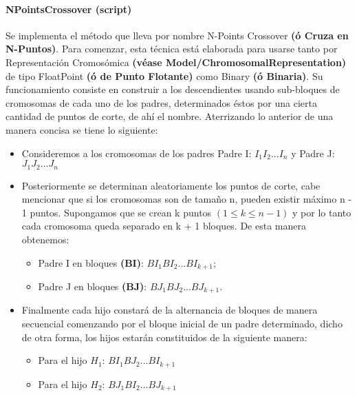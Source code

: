 \documentclass[class=report, crop=false]{standalone}
\begin{document}
\paragraph{NPointsCrossover (script)}
\label{sec:a_2_4_2_1}

\begin{fulllineitems}

\begin{DUlineblock}{0em}
\item[] Se implementa el método que lleva por nombre N-Points 
Crossover \textbf{(ó Cruza en N-Puntos)}.\break
Para comenzar, esta técnica está elaborada para usarse 
tanto por Representación Cromosómica \textbf{(véase Model/ChromosomalRepresentation)} 
de tipo FloatPoint \textbf{(ó de Punto Flotante)} como Binary \textbf{(ó Binaria)}.\medskip\break
Su funcionamiento consiste en construir a los descendientes 
usando sub-bloques de cromosomas de cada uno de los padres, 
determinados éstos por una cierta cantidad de puntos de corte, 
de ahí el nombre.\break
Aterrizando lo anterior de una manera concisa se tiene lo siguiente:

\begin{itemize}
\item Consideremos a los cromosomas de los padres Padre I: \(I_1I_2...I_n\) y Padre J: \(J_1J_2...J_n\)
\item Posteriormente se determinan aleatoriamente los puntos de corte, cabe mencionar que si los cromosomas son de tamaño n, pueden existir máximo n - 1 puntos. Supongamos que se crean k puntos \((1 \leqslant k \leqslant n - 1)\) y por lo tanto cada cromosoma queda separado en k + 1 bloques.\break
De esta manera obtenemos:
      \begin{itemize}
      \item Padre I en bloques \textbf{(BI)}: \(BI_1BI_2...BI_{k + 1}\);
      \item Padre J en bloques \textbf{(BJ)}: \(BJ_1BJ_2...BJ_{k + 1}\).
      \end{itemize}
\item Finalmente cada hijo constará de la alternancia de bloques de manera secuencial comenzando por el bloque inicial de un padre determinado, dicho de otra forma, los hijos estarán constituidos de la siguiente manera:
      \begin{itemize}
      \item Para el hijo \(H_1\): \(BI_1BJ_2...BI_{k + 1}\)
      \item Para el hijo \(H_2\): \(BJ_1BI_2...BJ_{k + 1}\)
      \end{itemize}
\end{itemize}


\end{DUlineblock}
\end{fulllineitems}
\end{document}

